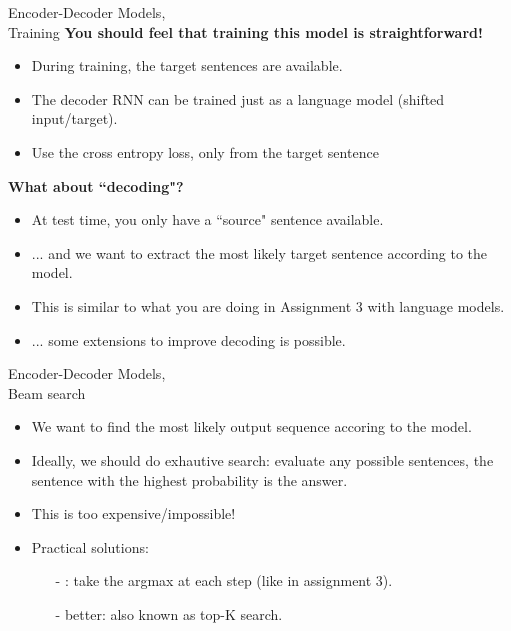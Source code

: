 \begin{frame}{Encoder-Decoder Models,\\Training}
\textbf{You should feel that training this model is straightforward!}
\begin{itemize}
\item During training, the target sentences are available.
\item The decoder RNN can be trained just as a language model (shifted input/target).
\item Use the cross entropy loss, only from the target sentence
\end{itemize}
\vsp
\pause
\textbf{What about ``decoding"?}
\begin{itemize}
\item At test time, you only have a ``source" sentence available.
\item ... and we want to extract the most likely target sentence according to the model.
\item This is similar to what you are doing in Assignment 3 with language models.
\item ... some extensions to improve decoding is possible.
\end{itemize}
\end{frame}

\begin{frame}{Encoder-Decoder Models,\\ Beam search}
\begin{itemize}
\item We want to find the most likely output sequence accoring to the model.
\item Ideally, we should do exhautive search: evaluate any possible sentences, the sentence with the highest probability is the answer.
\item This is too expensive/impossible!
\item Practical solutions:
\begin{itemize}
\item[-] : take the argmax at each step (like in assignment 3).
\item[-] better:  also known as top-K search.
\end{itemize}
\end{itemize}
\end{frame}

